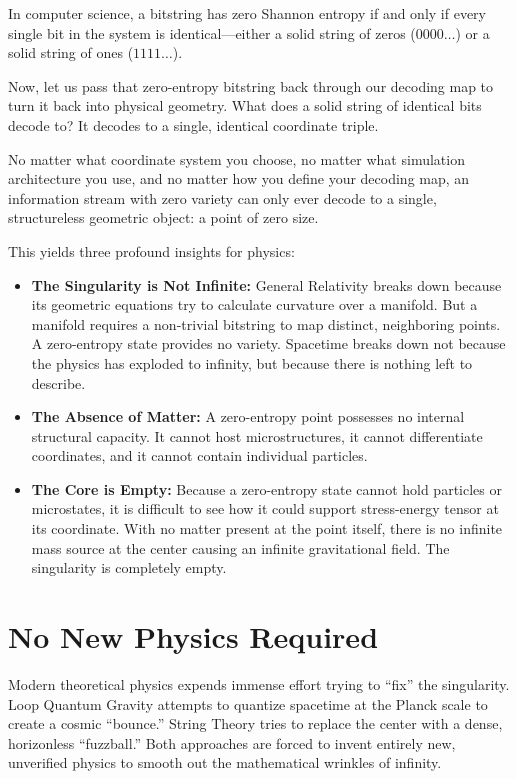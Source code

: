In computer science, a bitstring has zero Shannon entropy if and only if every
single bit in the system is identical—either a solid string of zeros ($0000\dots$) or a
solid string of ones ($1111\dots$). 

Now, let us pass that zero-entropy bitstring back through our decoding map to turn it back into physical geometry.
What does a solid string of identical bits decode to? It decodes to a single, identical coordinate triple. 

No matter what coordinate system you choose, no matter what simulation architecture you use,
and no matter how you define your decoding map, an information stream with zero variety can
only ever decode to a single, structureless geometric object: a point of zero size.

This yields three profound insights for physics:

\begin{itemize}
\item \textbf{The Singularity is Not Infinite:} General Relativity breaks down because its
  geometric equations try to calculate curvature over a manifold.
  But a manifold requires a non-trivial bitstring to map distinct, neighboring points.
  A zero-entropy state provides no variety. Spacetime breaks down not because the physics has
  exploded to infinity, but because there is nothing left to describe. 
\item \textbf{The Absence of Matter:} A zero-entropy point possesses no internal structural capacity.
  It cannot host microstructures, it cannot differentiate coordinates, and it cannot contain individual particles. 
\item \textbf{The Core is Empty:} Because a zero-entropy state cannot hold particles
  or microstates, it is difficult to see how it could support stress-energy tensor at its coordinate.
  With no matter present at the point itself, there is no infinite mass source at the center
  causing an infinite gravitational field. The singularity is completely empty.
\end{itemize}

\section{No New Physics Required}

Modern theoretical physics expends immense effort trying to ``fix'' the singularity.
Loop Quantum Gravity attempts to quantize spacetime at the Planck scale to create a cosmic ``bounce.''
String Theory tries to replace the center with a dense, horizonless ``fuzzball.''
Both approaches are forced to invent entirely new, unverified physics to smooth out the mathematical wrinkles of infinity.

